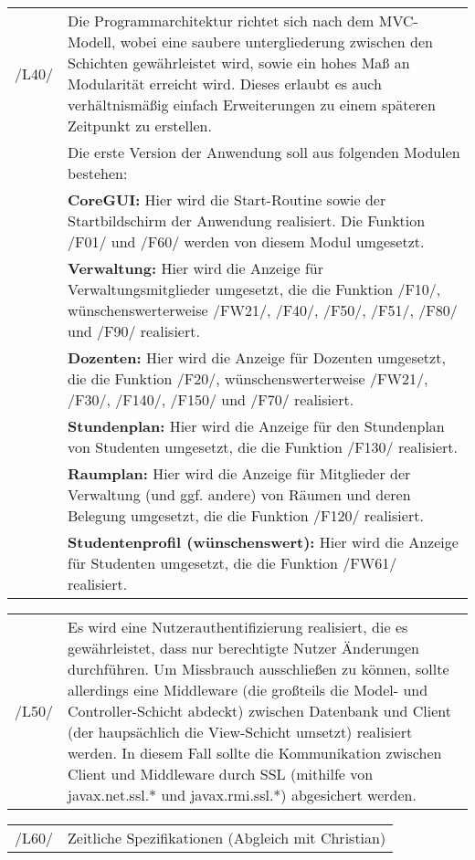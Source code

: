 \begin{tabular}{p{1.5cm}p{14.5cm}}
						
	 /L40/	& Die Programmarchitektur richtet sich nach dem MVC-Modell, wobei eine saubere untergliederung zwischen den Schichten gewährleistet wird, sowie ein hohes Maß an Modularität erreicht wird. Dieses erlaubt es auch verhältnismäßig einfach Erweiterungen zu einem späteren Zeitpunkt zu erstellen. \\
	 &	Die erste Version der Anwendung soll aus folgenden Modulen bestehen: \\
	 &	\textbf{CoreGUI:} Hier wird die Start-Routine sowie der Startbildschirm der Anwendung realisiert. Die Funktion /F01/ und /F60/ werden von diesem Modul umgesetzt.\\
	 &	\textbf{Verwaltung:} Hier wird die Anzeige für Verwaltungsmitglieder umgesetzt, die die Funktion /F10/, wünschenswerterweise /FW21/, /F40/, /F50/, /F51/, /F80/ und /F90/ realisiert.\\
	 &	\textbf{Dozenten:} Hier wird die Anzeige für Dozenten umgesetzt, die die Funktion /F20/, wünschenswerterweise /FW21/, /F30/, /F140/, /F150/ und /F70/ realisiert.\\
	 &	\textbf{Stundenplan:} Hier wird die Anzeige für den Stundenplan von Studenten umgesetzt, die die Funktion /F130/ realisiert.\\
	 &	\textbf{Raumplan:} Hier wird die Anzeige für Mitglieder der Verwaltung (und ggf. andere) von Räumen und deren Belegung umgesetzt, die die Funktion /F120/ realisiert.\\
	 &	\textbf{Studentenprofil (wünschenswert):} Hier wird die Anzeige für Studenten umgesetzt, die die Funktion /FW61/ realisiert.\\[0.25cm]

\end{tabular}


\begin{tabular}{p{1.5cm}p{14.5cm}}
					
	 /L50/	& Es wird eine Nutzerauthentifizierung realisiert, die es gewährleistet, dass nur berechtigte Nutzer Änderungen durchführen. Um Missbrauch ausschließen zu können, sollte allerdings eine Middleware (die großteils die Model- und Controller-Schicht abdeckt) zwischen Datenbank und Client (der haupsächlich die View-Schicht umsetzt) realisiert werden. In diesem Fall sollte die Kommunikation zwischen Client und Middleware durch SSL (mithilfe von javax.net.ssl.* und javax.rmi.ssl.*) abgesichert werden. \\[0.25cm]
	
\end{tabular}


\begin{tabular}{p{1.5cm}p{14.5cm}}
					
	 /L60/	& Zeitliche Spezifikationen (Abgleich mit Christian) \\[0.25cm]
	
\end{tabular}



% 
